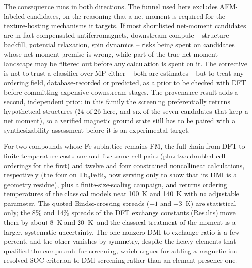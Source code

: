 \documentclass[aps,prb,preprint,superscriptaddress,longbibliography,nofootinbib]{revtex4-2}
\begin{document}
The consequence runs in both directions. The funnel used here excludes AFM-labeled candidates, on the reasoning
that a net moment is required for the texture-hosting mechanisms it targets. If most shortlisted net-moment
candidates are in fact compensated antiferromagnets, downstream compute -- structure backfill, potential
relaxation, spin dynamics -- risks being spent on candidates whose net-moment premise is wrong, while part of
the true net-moment landscape may be filtered out before any calculation is spent on it. The corrective is not
to trust a classifier over MP either -- both are estimates -- but to treat any ordering field,
database-recorded or predicted, as a prior to be checked with DFT before committing expensive downstream
stages. The provenance result adds a second, independent prior: in this family the screening preferentially
returns hypothetical structures (24 of 26 here, and six of the seven candidates that keep a net moment), so a verified magnetic
ground state still has to be paired with a synthesizability assessment before it is an experimental target.

For two compounds whose Fe sublattice remains FM, the full chain from DFT to finite temperature costs one and five same-cell
pairs (plus two doubled-cell orderings for the first) and twelve and four constrained noncollinear calculations, respectively (the four on Tb$_6$FeBi$_2$
now serving only to show that its DMI is a geometry residue), plus a finite-size-scaling
campaign, and returns ordering temperatures of the classical models near 100~K and 140~K with no adjustable
parameter. The quoted Binder-crossing spreads ($\pm1$ and $\pm3$~K) are statistical only; the 8\% and 14\% spreads of
the DFT exchange constants (Results) move them by about 8~K and 20~K, and the classical treatment of the moment
is a larger, systematic uncertainty. The one nonzero DMI-to-exchange
ratio is a few percent, and the other vanishes by symmetry, despite the heavy elements that qualified the compounds for screening, which
argues for adding a magnetic-ion-resolved SOC criterion to DMI screening rather than an element-presence one.
\end{document}
